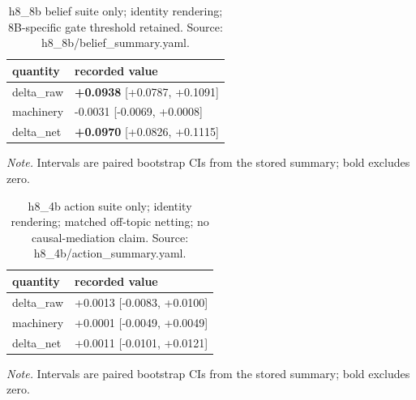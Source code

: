 \documentclass[10pt]{article}
\begin{document}
\begin{table}[H]
\centering
\footnotesize
\caption{ h8\_8b belief suite only; identity rendering; 8B-specific gate threshold retained. Source: h8\_8b/belief\_summary.yaml. }
\label{tab:belief_transfer}



\begin{tabular}{ ll }
\toprule
quantity & recorded value \\
\midrule

delta\_raw & \textbf{+0.0938} [+0.0787, +0.1091] \\

machinery & -0.0031 [-0.0069, +0.0008] \\

delta\_net & \textbf{+0.0970} [+0.0826, +0.1115] \\

\bottomrule
\end{tabular}

\par\footnotesize\emph{Note.} Intervals are paired bootstrap CIs from the stored summary; bold excludes zero.
\end{table}


\begin{table}[H]
\centering
\footnotesize
\caption{ h8\_4b action suite only; identity rendering; matched off-topic netting; no causal-mediation claim. Source: h8\_4b/action\_summary.yaml. }
\label{tab:action_transfer}



\begin{tabular}{ ll }
\toprule
quantity & recorded value \\
\midrule

delta\_raw & +0.0013 [-0.0083, +0.0100] \\

machinery & +0.0001 [-0.0049, +0.0049] \\

delta\_net & +0.0011 [-0.0101, +0.0121] \\

\bottomrule
\end{tabular}

\par\footnotesize\emph{Note.} Intervals are paired bootstrap CIs from the stored summary; bold excludes zero.
\end{table}
\end{document}
